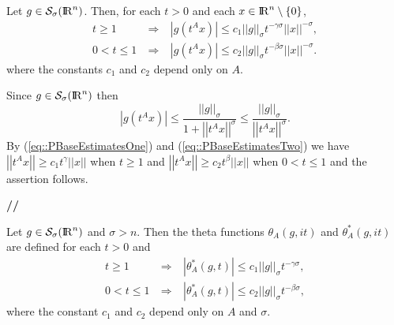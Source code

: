 \documentclass[12pt,a4paper]{amsart}
\begin{document}
{\begin{lemma}\label{prop::GBellEstimate}
Let ${g}\in{{\mathcal{S}}_{\sigma}({{\rm I\kern-.185em R}}^{n})}$.
Then, for each ${t}>0$ and each ${x}\in{{\rm I\kern-.185em R}}^{n}\setminus\{0\}$,
\begin{eqnarray}
{t}\geq1\ &\Longrightarrow&\ 
{\left|{{g}({t}^{A}{x})}\right|}\leq
{c}_1{{\left|\!\left|{g}\right|\!\right|}_{\sigma}}
{t}^{-{\gamma}{\sigma}}{\left|\!\left|{x}\right|\!\right|}^{-{\sigma}},
\nonumber\\
0<{t}\leq1\ &\Longrightarrow&\ 
{\left|{{g}({t}^{A}{x})}\right|}\leq
{c}_2{{\left|\!\left|{g}\right|\!\right|}_{\sigma}}
{t}^{-{\beta}{\sigma}}{\left|\!\left|{x}\right|\!\right|}^{-{\sigma}}.
\nonumber
\end{eqnarray}
where the constants ${c}_1$ and ${c}_2$
depend only on ${A}$.
\end{lemma}
{\removelastskip\par\medskip\goodbreak{}}
Since ${g}\in{{\mathcal{S}}_{\sigma}({{\rm I\kern-.185em R}}^{n})}$ then
\begin{equation}\nonumber
{\left|{{g}({t}^{A}{x})}\right|}\leq
\frac{{{\left|\!\left|{g}\right|\!\right|}_{\sigma}}}{1+{\left|\!\left|{{t}^{A}{x}}\right|\!\right|}^{\sigma}}\leq
\frac{{{\left|\!\left|{g}\right|\!\right|}_{\sigma}}}{{\left|\!\left|{{t}^{A}{x}}\right|\!\right|}^{\sigma}}.
\end{equation}
By (\ref{eq::PBaseEstimatesOne}) and (\ref{eq::PBaseEstimatesTwo}) we have
${\left|\!\left|{{t}^{A}{x}}\right|\!\right|}\geq{c}_1{t}^{\gamma}{\left|\!\left|{x}\right|\!\right|}$
when ${t}\geq1$ and 
${\left|\!\left|{{t}^{A}{x}}\right|\!\right|}\geq{c}_2{t}^{\beta}{\left|\!\left|{x}\right|\!\right|}$
when $0<{t}\leq1$
and the assertion follows.
{{\bf //}\par\smallskip}

\begin{lemma}\label{prop::ThetaEstimates}
Let ${g}\in{{\mathcal{S}}_{\sigma}({{\rm I\kern-.185em R}}^{n})}$ and ${\sigma}>{n}$.
Then the theta functions
${{\theta}_{{A}}\left({g},{i{t}}\right)}$ and
${{\theta}_{{A}}^*\left({{g}},{i{t}}\right)}$
are defined for each ${t}>0$ and
\begin{eqnarray}
\label{eq::ThetaEstimateA}
{t}\geq1\ &\Longrightarrow&\ 
\left|{{\theta}_{{A}}^*\left({{g}},{{t}}\right)}\right|\leq
{c}_1{{\left|\!\left|{g}\right|\!\right|}_{\sigma}}{t}^{-{\gamma}{\sigma}},
\\
\label{eq::ThetaEstimateB}
0<{t}\leq1\ &\Longrightarrow&\ 
\left|{{\theta}_{{A}}^*\left({{g}},{{t}}\right)}\right|\leq
{c}_2{{\left|\!\left|{g}\right|\!\right|}_{\sigma}}{t}^{-{\beta}{\sigma}},
\end{eqnarray}
where the constant ${c}_1$ and ${c}_2$
depend only on ${A}$ and ${\sigma}$.
\end{lemma}

}
\end{document}
